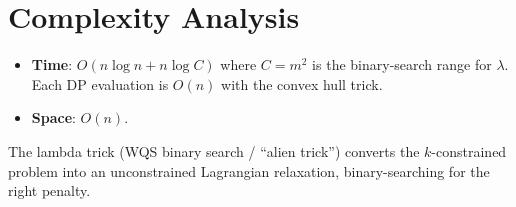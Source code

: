 \documentclass[11pt,a4paper]{article}
\begin{document}
\section{Complexity Analysis}

\begin{itemize}
  \item \textbf{Time}: $O(n \log n + n \log C)$ where $C = m^2$ is the binary-search range for $\lambda$. Each DP evaluation is $O(n)$ with the convex hull trick.
  \item \textbf{Space}: $O(n)$.
\end{itemize}

The lambda trick (WQS binary search / ``alien trick'') converts the $k$-constrained problem into an unconstrained Lagrangian relaxation, binary-searching for the right penalty.
\end{document}
